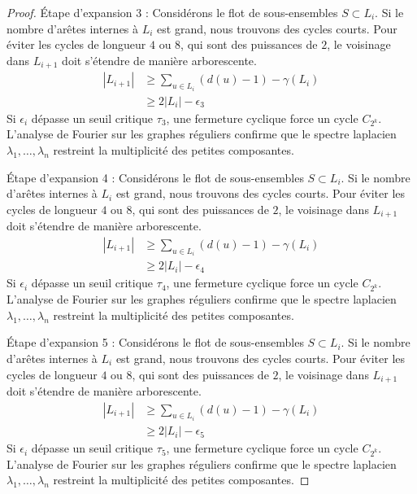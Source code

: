 \documentclass[11pt,a4paper]{article}
\theoremstyle{definition}
\begin{document}
\begin{proof}
Étape d'expansion 3 :
Considérons le flot de sous-ensembles $S \subset L_i$. Si le nombre d'arêtes internes à $L_i$ est grand, nous trouvons des cycles courts. Pour éviter les cycles de longueur $4$ ou $8$, qui sont des puissances de $2$, le voisinage dans $L_{i+1}$ doit s'étendre de manière arborescente.
\begin{align*}
|L_{i+1}| &\ge \sum_{u \in L_i} (d(u) - 1) - \gamma(L_i) \\
&\ge 2|L_i| - \epsilon_3
\end{align*}
Si $\epsilon_i$ dépasse un seuil critique $\tau_3$, une fermeture cyclique force un cycle $C_{2^k}$.
L'analyse de Fourier sur les graphes réguliers confirme que le spectre laplacien $\lambda_1, \dots, \lambda_n$ restreint la multiplicité des petites composantes.

Étape d'expansion 4 :
Considérons le flot de sous-ensembles $S \subset L_i$. Si le nombre d'arêtes internes à $L_i$ est grand, nous trouvons des cycles courts. Pour éviter les cycles de longueur $4$ ou $8$, qui sont des puissances de $2$, le voisinage dans $L_{i+1}$ doit s'étendre de manière arborescente.
\begin{align*}
|L_{i+1}| &\ge \sum_{u \in L_i} (d(u) - 1) - \gamma(L_i) \\
&\ge 2|L_i| - \epsilon_4
\end{align*}
Si $\epsilon_i$ dépasse un seuil critique $\tau_4$, une fermeture cyclique force un cycle $C_{2^k}$.
L'analyse de Fourier sur les graphes réguliers confirme que le spectre laplacien $\lambda_1, \dots, \lambda_n$ restreint la multiplicité des petites composantes.

Étape d'expansion 5 :
Considérons le flot de sous-ensembles $S \subset L_i$. Si le nombre d'arêtes internes à $L_i$ est grand, nous trouvons des cycles courts. Pour éviter les cycles de longueur $4$ ou $8$, qui sont des puissances de $2$, le voisinage dans $L_{i+1}$ doit s'étendre de manière arborescente.
\begin{align*}
|L_{i+1}| &\ge \sum_{u \in L_i} (d(u) - 1) - \gamma(L_i) \\
&\ge 2|L_i| - \epsilon_5
\end{align*}
Si $\epsilon_i$ dépasse un seuil critique $\tau_5$, une fermeture cyclique force un cycle $C_{2^k}$.
L'analyse de Fourier sur les graphes réguliers confirme que le spectre laplacien $\lambda_1, \dots, \lambda_n$ restreint la multiplicité des petites composantes.


\end{proof}
\end{document}
